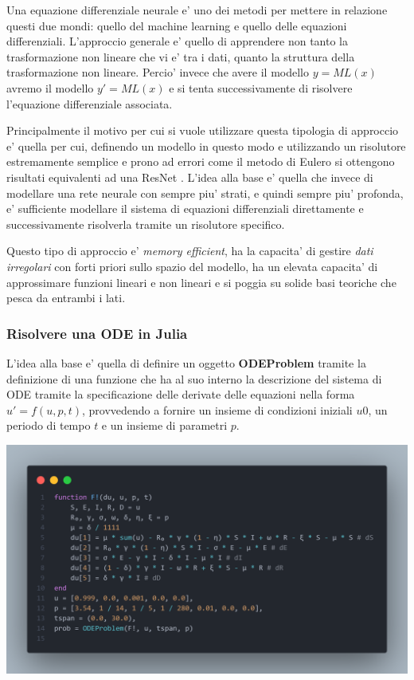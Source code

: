 Una equazione differenziale neurale e' uno dei metodi per mettere in relazione
questi due mondi: quello del machine learning e quello delle equazioni differenziali.
L'approccio generale e' quello di apprendere non tanto la trasformazione
non lineare che vi e' tra i dati, quanto la struttura della trasformazione non 
lineare. Percio' invece che avere il modello $y = ML(x)$ avremo il modello 
$y' = ML(x)$ e si tenta successivamente di risolvere l'equazione differenziale 
associata.

Principalmente il motivo per cui si vuole utilizzare questa tipologia di approccio 
e' quella per cui, definendo un modello in questo modo e utilizzando un risolutore
estremamente semplice e prono ad errori come il metodo di Eulero \cite{wiki:Euler_method}
si ottengono risultati equivalenti ad una ResNet \cite{he2015deep}. L'idea alla base
e' quella che invece di modellare una rete neurale con sempre piu' strati, e quindi 
sempre piu' profonda, e' sufficiente modellare il sistema di equazioni differenziali
direttamente e successivamente risolverla tramite un risolutore specifico.

Questo tipo di approccio e' \emph{memory efficient}, ha la capacita' di gestire
\emph{dati irregolari} con forti priori sullo spazio del modello, ha un elevata
capacita' di approssimare funzioni lineari e non lineari e si poggia su solide basi 
teoriche che pesca da entrambi i lati.

\subsubsection*{Risolvere una ODE in Julia}
L'idea alla base e' quella di definire un oggetto \textbf{ODEProblem} tramite la 
definizione di una funzione che ha al suo interno la descrizione del sistema di ODE 
tramite la specificazione delle derivate delle equazioni nella forma $u' = f(u, p, t)$,
provvedendo a fornire un insieme di condizioni iniziali $u0$, un periodo di tempo $t$
e un insieme di parametri $p$.

\begin{minipage}{\linewidth}
    \centering
    \includegraphics[width=\textwidth]{img/fdefinition.png}
    \label{fig:ODE_Julia_example}
\end{minipage}


